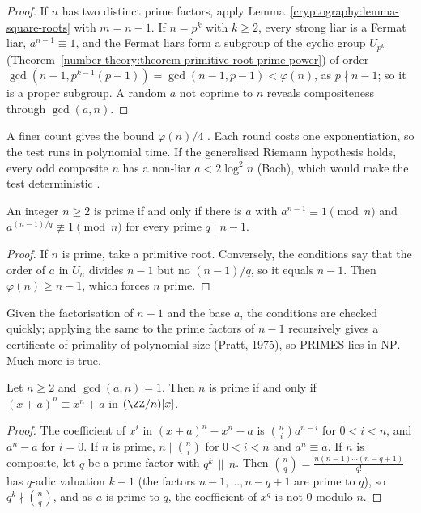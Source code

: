 \begin{proof}
If $n$ has two distinct prime factors, apply Lemma~\ref{cryptography:lemma-square-roots} with $m = n - 1$. If $n = p^k$ with $k \geq 2$, every strong liar is a Fermat liar, $a^{n-1} \equiv 1$, and the Fermat
liars form a subgroup of the cyclic group $U_{p^k}$ (Theorem~\ref{number-theory:theorem-primitive-root-prime-power}) of order $\gcd(n - 1, p^{k-1}(p - 1)) = \gcd(n - 1, p - 1) < \varphi(n)$, as $p \nmid n - 1$; so it is a
proper subgroup. A random $a$ not coprime to $n$ reveals compositeness through $\gcd(a, n)$.
\end{proof}

A finer count gives the bound $\varphi(n)/4$ \cite{crandall-pomerance}. Each round costs one exponentiation, so the test runs in polynomial time. If the generalised Riemann hypothesis holds, every odd
composite $n$ has a non-liar $a < 2\log^2n$ (Bach), which would make the test deterministic \cite{crandall-pomerance}.

\begin{theorem}\label{cryptography:theorem-lucas}
An integer $n \geq 2$ is prime if and only if there is $a$ with $a^{n-1} \equiv 1 \pmod n$ and $a^{(n-1)/q} \not\equiv 1 \pmod n$ for every prime $q \mid n - 1$.
\end{theorem}

\begin{proof}
If $n$ is prime, take a primitive root. Conversely, the conditions say that the order of $a$ in $U_n$ divides $n - 1$ but no $(n - 1)/q$, so it equals $n - 1$. Then $\varphi(n) \geq n - 1$, which forces $n$ prime.
\end{proof}

Given the factorisation of $n - 1$ and the base $a$, the conditions are checked quickly; applying the same to the prime factors of $n - 1$ recursively gives a certificate of primality of polynomial size
(Pratt, 1975), so PRIMES lies in $\mathrm{NP}$. Much more is true.

\begin{lemma}\label{cryptography:lemma-aks}
Let $n \geq 2$ and $\gcd(a, n) = 1$. Then $n$ is prime if and only if $(x + a)^n \equiv x^n + a$ in $(\ZZ/n)[x]$.
\end{lemma}

\begin{proof}
The coefficient of $x^i$ in $(x + a)^n - x^n - a$ is $\binom nia^{n-i}$ for $0 < i < n$, and $a^n - a$ for $i = 0$. If $n$ is prime, $n \mid \binom ni$ for $0 < i < n$ and $a^n \equiv a$. If $n$ is composite, let
$q$ be a prime factor with $q^k \,\|\, n$. Then $\binom nq = \frac{n(n-1)\cdots(n - q + 1)}{q!}$ has $q$-adic valuation $k - 1$ (the factors $n - 1, \dots, n - q + 1$ are prime to $q$), so $q^k \nmid \binom nq$, and as
$a$ is prime to $q$, the coefficient of $x^q$ is not $0$ modulo $n$.
\end{proof}

